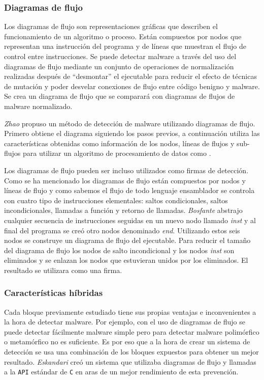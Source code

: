 \documentclass[12pt]{article}
\newcommand{\newpar} {
    \vskip 0.5cm
}
\begin{document}
            \subsubsection{Diagramas de flujo}
                Los diagramas de flujo son representaciones gráficas que describen el funcionamiento de un algoritmo o proceso. Están compuestos por nodos que representan una instrucción del programa y de líneas que muestran el flujo de control entre instrucciones. Se puede detectar malware a través del uso del diagramas de flujo \cite{bib:malware_flow} mediante un conjunto de operaciones de normalización realizadas después de “desmontar” el ejecutable para reducir el efecto de técnicas de mutación y poder desvelar conexiones de flujo entre código benigno y malware. Se crea un diagrama de flujo que se comparará con diagramas de flujos de malware normalizado.

                \newpar

                \textit{Zhao} \cite{bib:malware_graphs} propuso un método de detección de malware utilizando diagramas de flujo. Primero obtiene el diagrama siguiendo los pasos previos, a continuación utiliza las características obtenidas como información de los nodos, líneas de flujos y sub-flujos para utilizar un algoritmo de procesamiento de datos como \cite{bib:malware_f_a, bib:malware_f_b, bib:malware_f_c}.

                \newpar

                Los diagramas de flujo pueden ser incluso utilizados como firmas de detección. Como se ha mencionado los diagramas de flujo están compuestos por nodos y líneas de flujo y como sabemos el flujo de todo lenguaje ensamblador se controla con cuatro tipo de instrucciones elementales: saltos condicionales, saltos incondicionales, llamadas a función y retorno de llamadas. \textit{Bosfante} \cite{bib:malware_nodes} abstrajo cualquier secuencia de instrucciones seguidas en un nuevo nodo llamado \textit{inst} y al final del programa se creó otro nodos denominado \textit{end}. Utilizando estos seis nodos se construye un diagrama de flujo del ejecutable. Para reducir el tamaño del diagrama de flujo los nodos de salto incondicional y los nodos \textit{inst} son eliminados y se enlazan los nodos que estuvieran unidos por los eliminados. El resultado se utilizara como una firma.

            \subsubsection{Características híbridas}
                Cada bloque previamente estudiado tiene sus propias ventajas e inconvenientes a la hora de detectar malware. Por ejemplo, con el uso de diagramas de flujo se puede detectar fácilmente malware simple pero para detectar malware polimórfico o metamórfico no es suficiente. Es por eso que a la hora de crear un sistema de detección se usa una combinación de los bloques expuestos para obtener un mejor resultado. \textit{Eskandari} \cite{bib:malware_hybrid} creó un sistema que utilizaba diagramas de flujo y llamadas a la \texttt{API} estándar de \texttt{C} en aras de un mejor rendimiento de esta prevención.
\end{document}
